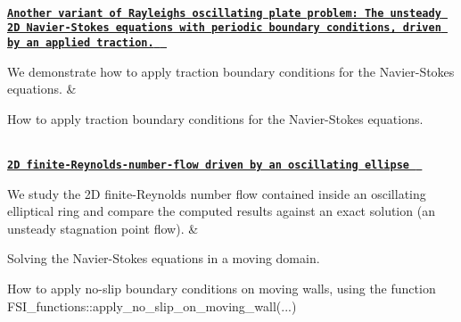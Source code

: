 \begin{longtabu}
\\
\href{../../navier_stokes/rayleigh_traction_channel/html/index.html}{\tt {\bfseries Another variant of Rayleigh\textquotesingle{}s oscillating plate problem\+: The unsteady 2D Navier-\/\+Stokes equations with periodic boundary conditions, driven by an applied traction. } }

We demonstrate how to apply traction boundary conditions for the Navier-\/\+Stokes equations.  &
\begin{DoxyItemize}
\item How to apply traction boundary conditions for the Navier-\/\+Stokes equations.
\end{DoxyItemize}

\\
\href{../../navier_stokes/osc_ellipse/html/index.html}{\tt {\bfseries  2D finite-\/\+Reynolds-\/number-\/flow driven by an oscillating ellipse } }

We study the 2D finite-\/\+Reynolds number flow contained inside an oscillating elliptical ring and compare the computed results against an exact solution (an unsteady stagnation point flow).  &
\begin{DoxyItemize}
\item Solving the Navier-\/\+Stokes equations in a moving domain.
\item How to apply no-\/slip boundary conditions on moving walls, using the function {\ttfamily F\+S\+I\+\_\+functions\+::apply\+\_\+no\+\_\+slip\+\_\+on\+\_\+moving\+\_\+wall}(...) 
\end{DoxyItemize}



\\
\end{longtabu}
\tabulinesep=1mm
